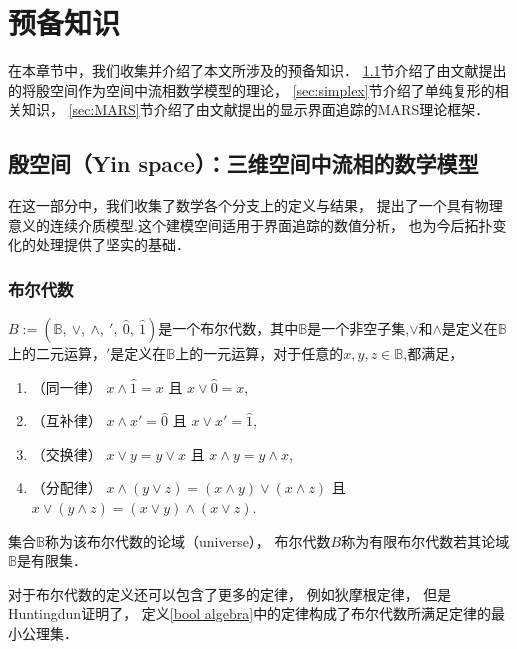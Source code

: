 \chapter{预备知识}
在本章节中，我们收集并介绍了本文所涉及的预备知识．
\ref{sec:YinSpace}节介绍了由文献\cite{zhang18:cubicMARS}提出的将殷空间作为空间中流相数学模型的理论，
\ref{sec:simplex}节介绍了单纯复形的相关知识，
\ref{sec:MARS}节介绍了由文献\cite{zhang16:_mars}提出的显示界面追踪的MARS理论框架．


\section{殷空间（Yin space）：三维空间中流相的数学模型}
\label{sec:YinSpace}
在这一部分中，我们收集了数学各个分支上的定义与结果，
提出了一个具有物理意义的连续介质模型.这个建模空间适用于界面追踪的数值分析，
也为今后拓扑变化的处理提供了坚实的基础．
\subsection{布尔代数}
\begin{defn}
	\label{bool algebra}
	$B :=( \mathbb{B},\    \vee,\   \wedge,\   ',\   \hat{0}, \   \hat{1} )$是一个布尔代数，其中$\mathbb{B}$是一个非空子集,$\vee$和$\wedge$是定义在$\mathbb{B}$上的二元运算，$'$是定义在$\mathbb{B}$上的一元运算，对于任意的$x,y,z\in \mathbb{B}$,都满足，
	 \begin{enumerate}[]
	 		\setlength{\itemsep}{0pt}
	 	\setlength{\parsep}{0pt}
	 	\setlength{\parskip}{0pt}
		\item （同一律）%
		$x\wedge \hat{1} = x$ 且 $x\vee \hat{0}=x$,
		\item （互补律）%
		$x\wedge x' = \hat{0}$ 且  $x\vee x'=\hat{1}$,
		\item （交换律）%
		$x\vee y = y\vee x$ 且
		$x\wedge y = y\wedge x$, 
		\item （分配律）%
		$x\wedge (y\vee z) = (x\wedge y)\vee (x\wedge z)$ 且
		$x\vee (y\wedge z) = (x\vee y)\wedge (x\vee z)$.
	\end{enumerate}
集合$\mathbb{B}$称为该布尔代数的论域（universe），
布尔代数$B$称为有限布尔代数若其论域$\mathbb{B}$是有限集．
\end{defn}
对于布尔代数的定义还可以包含了更多的定律，
例如狄摩根定律\cite{burris81:_cours_univer_algeb,givant09:_introd_boolean_algeb}，
但是Huntingdun\cite{huntington04:_sets_indep_postul_algeb_logic}证明了，
定义\ref{bool algebra}中的定律构成了布尔代数所满足定律的最小公理集．

